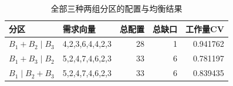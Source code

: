 \begin{table}[htbp]\centering\small
\caption{全部三种两组分区的配置与均衡结果}\label{tab:q4_partitions}
\begin{tabular}{@{}llrrr@{}}
\toprule
分区 & 需求向量 & 总配置 & 总缺口 & 工作量CV\\
\midrule
$B_1+B_2\mid B_3$ & 4,2,3,6,4,4,2,3 & 28 & 1 & 0.941762\\
$B_1+B_3\mid B_2$ & 5,2,4,7,4,6,2,3 & 33 & 6 & 0.781197\\
$B_1\mid B_2+B_3$ & 5,2,4,7,4,6,2,3 & 33 & 6 & 0.839435\\
\bottomrule
\end{tabular}
\end{table}
